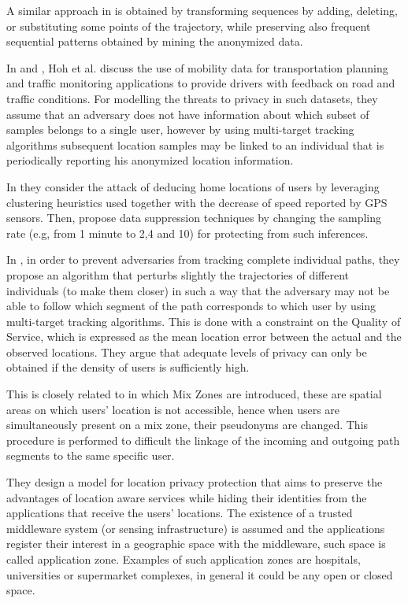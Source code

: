 \documentclass{llncs}
\begin{document}
A similar approach in \cite{Pensa2008} is obtained by transforming sequences by adding, deleting, or substituting some points of the trajectory, while preserving also frequent sequential patterns \cite{Agrawal:1995} obtained by mining the anonymized data.


In \cite{Hoh2005} and \cite{Hoh06}, Hoh et al. discuss the use of mobility data for transportation planning and traffic monitoring applications to provide drivers with feedback on road and traffic conditions.
For modelling the threats to privacy in such datasets, they assume that an adversary does not have information about which subset of samples belongs to a single user, however by using multi-target tracking algorithms \cite{Reid79analgorithm} subsequent location samples may be linked to an individual that is periodically reporting his anonymized location information.

In \cite{Hoh06} they consider the attack of deducing home locations of users by leveraging clustering heuristics used together with the decrease of speed reported by GPS sensors. Then, propose data suppression techniques by changing the sampling rate (e.g, from 1 minute to 2,4 and 10) for protecting from such inferences.

In \cite{Hoh2005}, in order to prevent adversaries from tracking complete individual paths, they propose an algorithm that perturbs slightly the trajectories of different individuals (to make them closer) in such a way that the adversary may not be able to follow which segment of the path corresponds to which user by using multi-target tracking algorithms.
This is done with a constraint on the Quality of Service, which is expressed as the mean location error between the actual and the observed locations. They argue that adequate levels of privacy can only be obtained if the density of users is sufficiently high.


This is closely related to \cite{Beresford2003} in which Mix Zones are introduced, these are spatial areas on which users' location is not accessible, hence when users are simultaneously present on a mix zone, their pseudonyms are changed. This procedure is performed to difficult the linkage of the incoming and outgoing path segments to the same specific user.

They design a model for location privacy protection that aims to preserve the advantages of location aware services while hiding their identities from the applications that receive the users' locations.
The existence of a trusted middleware system (or sensing infrastructure) is assumed and the applications register their interest in a geographic space with the middleware, such space is called application zone. Examples of such application zones are hospitals, universities or supermarket complexes, in general it could be any open or closed space.
\end{document}
